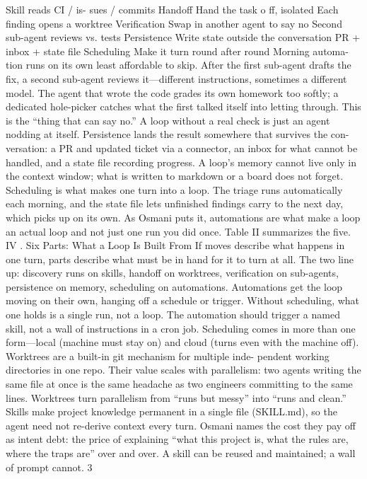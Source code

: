 \documentclass[conference]{IEEEtran}
\begin{document}
Skill reads CI / is-
sues / commits
Handoff Hand the task o ff,
isolated
Each finding opens
a worktree
Verification Swap in another
agent to say no
Second sub-agent
reviews vs. tests
Persistence Write state outside
the conversation
PR + inbox + state
file
Scheduling Make it turn round
after round
Morning automa-
tion runs on its own
least affordable to skip. After the first sub-agent drafts the fix, a
second sub-agent reviews it—different instructions, sometimes a
different model. The agent that wrote the code grades its own
homework too softly; a dedicated hole-picker catches what the
first talked itself into letting through. This is the “thing that can
say no.” A loop without a real check is just an agent nodding at
itself.
Persistence lands the result somewhere that survives the con-
versation: a PR and updated ticket via a connector, an inbox for
what cannot be handled, and a state file recording progress. A
loop’s memory cannot live only in the context window; what is
written to markdown or a board does not forget.
Scheduling is what makes one turn into a loop. The triage
runs automatically each morning, and the state file lets unfinished
findings carry to the next day, which picks up on its own. As
Osmani puts it, automations are what make a loop an actual loop
and not just one run you did once. Table II summarizes the five.
IV . Six Parts: What a Loop Is Built From
If moves describe what happens in one turn, parts describe
what must be in hand for it to turn at all. The two line up:
discovery runs on skills, handoff on worktrees, verification on
sub-agents, persistence on memory, scheduling on automations.
Automations get the loop moving on their own, hanging off
a schedule or trigger. Without scheduling, what one holds is a
single run, not a loop. The automation should trigger a named
skill, not a wall of instructions in a cron job. Scheduling comes
in more than one form—local (machine must stay on) and cloud
(turns even with the machine off).
Worktrees are a built-in git mechanism for multiple inde-
pendent working directories in one repo. Their value scales
with parallelism: two agents writing the same file at once is the
same headache as two engineers committing to the same lines.
Worktrees turn parallelism from “runs but messy” into “runs and
clean.”
Skills make project knowledge permanent in a single file
(SKILL.md), so the agent need not re-derive context every turn.
Osmani names the cost they pay off as intent debt: the price of
explaining “what this project is, what the rules are, where the
traps are” over and over. A skill can be reused and maintained; a
wall of prompt cannot.
3
\end{document}
